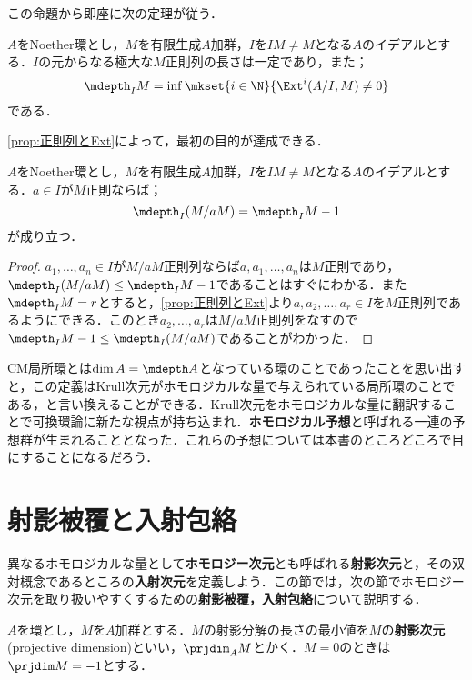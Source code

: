 この命題から即座に次の定理が従う．
\begin{thm}[Rees]\label{thm:Extとdepth}
	$A$をNoether環とし，$M$を有限生成$A$加群，$I$を$IM\neq M$となる$A$のイデアルとする．$I$の元からなる極大な$M$正則列の長さは一定であり，また；
	\[\mdepth_I M=\inf\mkset{i\in\N}{\Ext^i(A/I,M)\neq0}\]
	である．
\end{thm}

\ref{prop:正則列とExt}によって，最初の目的が達成できる．
\begin{lem}[\ref{lem:depth M/aM=depth M-1}の証明]\label{lem:depth M/aMについての証明}
	$A$をNoether環とし，$M$を有限生成$A$加群，$I$を$IM\neq M$となる$A$のイデアルとする．$a\in I$が$M$正則ならば；
	\[\mdepth_I (M/aM)=\mdepth_I M-1\]
	が成り立つ．
\end{lem}

\begin{proof}
	$a_1,\dots,a_n\in I$が$M/aM$正則列ならば$a,a_1,\dots,a_n$は$M$正則であり，$\mdepth_I(M/aM)\leq\mdepth_I M-1$であることはすぐにわかる．また$\mdepth_I M=r$とすると，\ref{prop:正則列とExt}より$a,a_2,\dots,a_r\in I$を$M$正則列であるようにできる．このとき$a_2,\dots,a_r$は$M/aM$正則列をなすので$\mdepth_I M-1\leq\mdepth_I(M/aM)$であることがわかった．
\end{proof}

CM局所環とは$\dim A=\mdepth A$となっている環のことであったことを思い出すと，この定義はKrull次元がホモロジカルな量で与えられている局所環のことである，と言い換えることができる．Krull次元をホモロジカルな量に翻訳することで可換環論に新たな視点が持ち込まれ．\textbf{ホモロジカル予想}と呼ばれる一連の予想群が生まれることとなった．これらの予想については本書のところどころで目にすることになるだろう．

\section{射影被覆と入射包絡}

異なるホモロジカルな量として\textbf{ホモロジー次元}とも呼ばれる\textbf{射影次元}と，その双対概念であるところの\textbf{入射次元}を定義しよう．この節では，次の節でホモロジー次元を取り扱いやすくするための\textbf{射影被覆，入射包絡}について説明する．

\begin{defi}[射影次元]
	$A$を環とし，$M$を$A$加群とする．$M$の射影分解の長さの最小値を$M$の\textbf{射影次元}(projective dimension)といい，$\prjdim_A M$とかく．$M=0$のときは$\prjdim M=-1$とする．
\end{defi}


